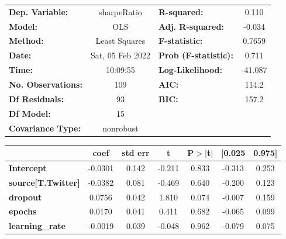 \begin{center}
\begin{tabular}{lclc}
\toprule
\textbf{Dep. Variable:}              &   sharpeRatio    & \textbf{  R-squared:         } &     0.110   \\
\textbf{Model:}                      &       OLS        & \textbf{  Adj. R-squared:    } &    -0.034   \\
\textbf{Method:}                     &  Least Squares   & \textbf{  F-statistic:       } &    0.7659   \\
\textbf{Date:}                       & Sat, 05 Feb 2022 & \textbf{  Prob (F-statistic):} &    0.711    \\
\textbf{Time:}                       &     10:09:55     & \textbf{  Log-Likelihood:    } &   -41.087   \\
\textbf{No. Observations:}           &         109      & \textbf{  AIC:               } &     114.2   \\
\textbf{Df Residuals:}               &          93      & \textbf{  BIC:               } &     157.2   \\
\textbf{Df Model:}                   &          15      & \textbf{                     } &             \\
\textbf{Covariance Type:}            &    nonrobust     & \textbf{                     } &             \\
\bottomrule
\end{tabular}
\begin{tabular}{lcccccc}
                                     & \textbf{coef} & \textbf{std err} & \textbf{t} & \textbf{P$> |$t$|$} & \textbf{[0.025} & \textbf{0.975]}  \\
\midrule
\textbf{Intercept}                   &      -0.0301  &        0.142     &    -0.211  &         0.833        &       -0.313    &        0.253     \\
\textbf{source[T.Twitter]}           &      -0.0382  &        0.081     &    -0.469  &         0.640        &       -0.200    &        0.123     \\
\textbf{dropout}                     &       0.0756  &        0.042     &     1.810  &         0.074        &       -0.007    &        0.159     \\
\textbf{epochs}                      &       0.0170  &        0.041     &     0.411  &         0.682        &       -0.065    &        0.099     \\
\textbf{learning\_rate}              &      -0.0019  &        0.039     &    -0.048  &         0.962        &       -0.079    &        0.075     \\

\end{tabular}
\end{center}
